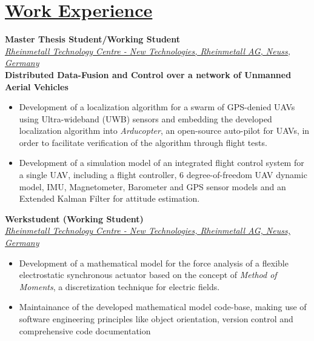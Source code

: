 
\section{\underline{Work Experience}}

\large{\textbf{Master Thesis Student/Working Student}}
\hfill
\masterarbeitdate\\
\href{https://www.rheinmetall.com/de/karriere/rheinmetall-als-arbeitgeber/menschen-projekte/karriere-extra-technology-center}{\large{\emph{Rheinmetall Technology Centre - New Technologies, Rheinmetall AG, Neuss, Germany}}}\\
\large{\textbf{Distributed Data-Fusion and Control over a network of Unmanned Aerial Vehicles}}
\begin{itemize}
	\item Development of a localization algorithm for a swarm of GPS-denied UAVs using Ultra-wideband (UWB) sensors and embedding the developed localization algorithm into \emph{Arducopter}, an open-source auto-pilot for UAVs, in order to facilitate verification of the algorithm through flight tests.
    \item Development of a simulation model of an integrated flight control system for a single UAV, including a flight controller, 6 degree-of-freedom UAV dynamic model, IMU, Magnetometer, Barometer and GPS sensor models and an Extended Kalman Filter for attitude estimation.
\end{itemize}

\vspace{0.1 in}

\large{\textbf{Werkstudent (Working Student)}}
\hfill
\rheinmetalldate\\
\href{https://www.rheinmetall.com/de/karriere/rheinmetall-als-arbeitgeber/menschen-projekte/karriere-extra-technology-center}{\large{\emph{Rheinmetall Technology Centre - New Technologies, Rheinmetall AG, Neuss, Germany}}}
\begin{itemize}
\item\large{Development of a mathematical model for the force analysis of a flexible electrostatic synchronous actuator based on the concept of \emph{Method of Moments}, a discretization technique for electric fields.}
\item\large{Maintainance of the developed mathematical model code-base, making use of software engineering principles like object orientation, version control and comprehensive code documentation}
\end{itemize}

